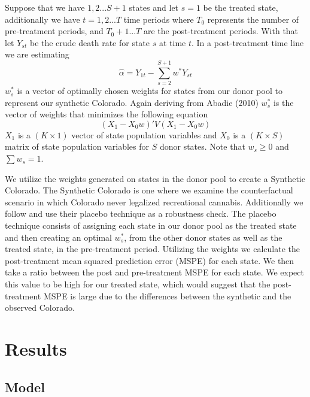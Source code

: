 \documentclass{article}
\begin{document}
Suppose that we have $1,2...S+1$ states and let $s = 1$ be the treated state, additionally we have $t = 1,2...T$ time periods where $T_0$ represents the number of pre-treatment periods, and $T_0 + 1...T$ are the post-treatment periods. With that let $Y_{st}$ be the crude death rate for state $s$ at time $t$. In a post-treatment time line we are estimating
\begin{equation*}
\hat{\alpha} = Y_{1t} - \sum_{s=2}^{S+1}w^{*}Y_{st}
\end{equation*}
$w^{*}_s$ is a vector of optimally chosen weights for states from our donor pool to represent our synthetic Colorado. Again deriving from Abadie (2010) $w^{*}_s$ is the vector of weights that minimizes the following equation
\begin{equation*}
(X_1 - X_0w)'V(X_1 - X_0w)
\end{equation*}
$X_1$ is a $(K \times 1)$ vector of state population variables and $X_0$ is a $(K \times S)$ matrix of state population variables for $S$ donor states. Note that $w_s \geq 0$ and $\sum w_s = 1$.

We utilize the weights generated on states in the donor pool to create a Synthetic Colorado. The Synthetic Colorado is one where we examine the counterfactual scenario in which Colorado never legalized recreational cannabis. Additionally we follow \citet{AbadieAlberto2010SCMf} and use their placebo technique as a robustness check. The placebo technique consists of assigning each state in our donor pool as the treated state and then creating an optimal $w^{*}_s$, from the other donor states as well as the treated state, in the pre-treatment period. Utilizing the weights we calculate the post-treatment mean squared prediction error (MSPE) for each state. We then take a ratio between the post and pre-treatment MSPE for each state. We expect this value to be high for our treated state, which would suggest that the post-treatment MSPE is large due to the differences between the synthetic and the observed Colorado.

\section{Results}

\subsection{Model}
\end{document}
